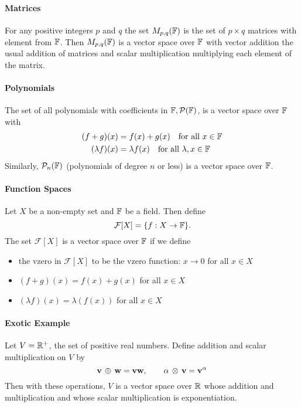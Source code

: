 \paragraph{Matrices}
For any positive integers \(p\) and \(q\) the set \(M_{p,q}(\mathbb{F})\) is the set of \(p \times q\) matrices with element from \(\mathbb{F}\). Then \(M_{p,q}(\mathbb{F})\) is a vector space over \(\mathbb{F}\) with vector addition the usual addition of matrices and scalar multiplication multiplying each element of the matrix.

\paragraph{Polynomials}
The set of all polynomials with coefficients in \(\mathbb{F}, \mathcal{P}(\mathbb{F})\), is a vector space over \(\mathbb{F}\) with 
\begin{align*}
(f+g)(x) & = f(x) + g(x) \quad \text{for all } x \in \mathbb{F} \\
(\lambda f)(x) & = \lambda f(x) \quad \text{for all } \lambda, x \in \mathbb{F}
\end{align*}
Similarly, \(\mathcal{P}_n(\mathbb{F})\) (polynomials of degree \(n\) or less) is a vector space over \(\mathbb{F}\).

\paragraph{Function Spaces}
Let \(X\) be a non-empty set and \(\mathbb{F}\) be a field. Then define
\[\mathcal{F}[X] = \{ f: X \to \mathbb{F} \}.\]
The set \(\mathcal{F}[X]\) is a vector space over \(\mathbb{F}\) if we define
\begin{itemize}
    \item the vzero in \(\mathcal{F}[X]\) to be the vzero function: \(x \to 0\) for all \(x \in X\)
    \item \((f + g)(x) = f(x) + g(x)\) for all \(x \in X\)
    \item \((\lambda f)(x) = \lambda(f(x))\) for all \(x \in X\)
\end{itemize}

\paragraph{Exotic Example}
Let \(V = \mathbb{R}^+\), the set of positive real numbers. Define addition and scalar multiplication on \(V\) by 
\[\mathbf{v} \, \oplus \, \mathbf{w} = \mathbf{v}\mathbf{w}, \qquad \alpha \, \otimes \, \mathbf{v} = \mathbf{v}^\alpha\]
Then with these operations, \(V\) is a vector space over \(\mathbb{R}\) whose addition and multiplication and whose scalar multiplication is exponentiation.

